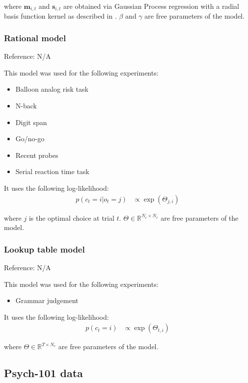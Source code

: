 \documentclass[pdflatex,sn-nature]{sn-jnl}%
\theoremstyle{thmstyleone}%
\theoremstyle{thmstyletwo}%
\theoremstyle{thmstylethree}%
\begin{document}
\noindent where $\mathbf{m}_{i,t}$ and $\mathbf{s}_{i,t}$ are obtained via Gaussian Process regression with a radial basis function kernel as described in \cite{wu2018generalization}. $\beta$ and $\gamma$ are free parameters of the model.

\subsubsection*{Rational model}

Reference: N/A 

\noindent This model was used for the following experiments:
\begin{itemize}
    \item Balloon analog risk task
    \item N-back
    \item Digit span
    \item Go/no-go
    \item Recent probes
    \item Serial reaction time task
\end{itemize}

\noindent It uses the following log-likelihood:
\begin{align*}
    p(c_t = i | o_t = j) &\propto \exp\left(\Theta_{j, i}\right)
\end{align*}

\noindent where $j$ is the optimal choice at trial $t$. $\Theta \in \mathbb{R}^{N_c \times N_c}$ are free parameters of the model.

\subsubsection*{Lookup table model}

Reference: N/A 

\noindent This model was used for the following experiments:
\begin{itemize}
    \item Grammar judgement
\end{itemize}

\noindent It uses the following log-likelihood:
\begin{align*}
    p(c_t = i) &\propto \exp\left(\Theta_{t,  i}\right)
\end{align*}

\noindent where $\Theta  \in \mathbb{R}^{T \times N_c}$ are free parameters of the model. 

\subsection*{Psych-101 data}
\end{document}
